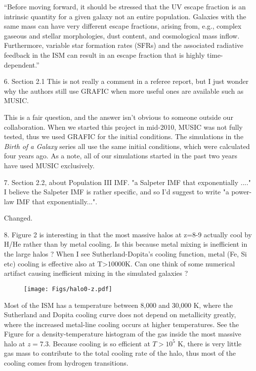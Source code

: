 \documentclass[11pt]{article}
\begin{document}
``Before moving forward, it should be stressed that the UV escape
fraction is an intrinsic quantity for a given galaxy not an entire
population.  Galaxies with the same mass can have very different
escape fractions, arising from, e.g., complex gaseous and stellar
morphologies, dust content, and cosmological mass inflow.
Furthermore, variable star formation rates (SFRs) and the associated
radiative feedback in the ISM can result in an escape fraction that is
highly time-dependent.''
 
\begin{referee}
6. Section 2.1
This is not really a comment in a referee report,
but I just wonder why the authors still use GRAFIC
when more useful ones are available such as MUSIC.
\end{referee}

This is a fair question, and the answer isn't obvious to someone
outside our collaboration.  When we started this project in mid-2010,
MUSIC was not fully tested, thus we used GRAFIC for the initial
conditions.  The simulations in the \textit{Birth of a Galaxy} series
all use the same initial conditions, which were calculated four years
ago.  As a note, all of our simulations started in the past two years
have used MUSIC exclusively.

\begin{referee}
7. Section 2.2, about Population III IMF.
"a Salpeter IMF that exponentially ...."
I believe the Salpeter IMF is rather specific, and so
I'd suggest to write "a power-law IMF that exponentially...".
\end{referee}

Changed.
 
\begin{referee}
8. Figure 2 is interesting in that the most massive halos
at z=8-9 actually cool by H/He rather than by metal
cooling. Is this because metal mixing is inefficient in
the large halos ? When I see Sutherland-Dopita's cooling
function, metal (Fe, Si etc) cooling is effective also at
T>10000K.
Can one think of some numerical artifact causing
inefficient mixing in the simulated galaxies ?
\end{referee}

\begin{figure}
  \centering
  \texttt{[image: Figs/halo0-z.pdf]}
\end{figure}

Most of the ISM has a temperature between 8,000 and 30,000 K, where
the Sutherland and Dopita cooling curve does not depend on metallicity
greatly, where the increased metal-line cooling occurs at higher
temperatures.  See the Figure for a density-temperature histogram of
the gas inside the most massive halo at $z = 7.3$.  Because cooling is
so efficient at $T > 10^5$ K, there is very little gas mass to
contribute to the total cooling rate of the halo, thus most of the
cooling comes from hydrogen transitions.
\end{document}
